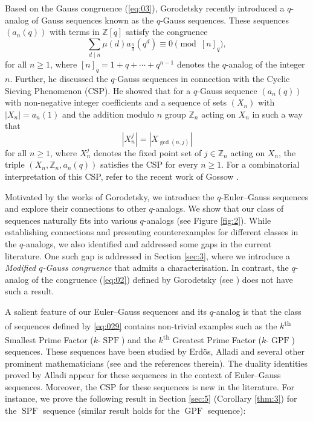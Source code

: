 \documentclass{article}
\numberwithin{equation}{section}
\theoremstyle{definition}
\begin{document}
Based on the Gauss congruence (\ref{eq:03}), Gorodetsky \cite{goro_q-gauss} recently introduced a $q$-analog of Gauss sequences known as the $q$-Gauss sequences. These sequences $(a_{n}(q))$ with terms in $\mathbb{Z}[q]$ satisfy the congruence
\begin{equation}
  \sum_{d\mid n}\mu(d)a_\frac{n}{d}(q^d)\equiv0\pmod{[n]_q}, 
\end{equation}
for all $n\geq1$, where $[n]_q=1+q+\cdots+q^{n-1}$ denotes the $q$-analog of the integer $n$. Further, he discussed the $q$-Gauss sequences in connection with the Cyclic Sieving Phenomenon (CSP). 
He showed that for a $q$-Gauss sequence $(a_n(q))$ with non-negative integer coefficients and a sequence of sets $(X_n)$ with $|X_n|=a_n(1)$ and the addition modulo $n$ group $\mathbb{Z}_n$ acting on $X_n$ in such a way that 
\begin{equation}\label{eq:020}
    |X_{n}^j|=|X_{\gcd(n,j)}|
\end{equation}
for all $n\geq1$, where $X_n^j$ denotes the fixed point set of $j\in\mathbb{Z}_n$ acting on $X_n$, the triple $(X_n, \mathbb{Z}_n, a_n(q))$ satisfies the CSP for every $n\geq1$. For a combinatorial interpretation of this CSP, refer to the recent work of Gossow \cite{fern_gauss}. 
  
Motivated by the works of Gorodetsky, we introduce the $q$-Euler--Gauss sequences and explore their connections to other $q$-analogs. We show that our class of sequences naturally fits into various $q$-analogs (see Figure \ref{fig:2}). While establishing connections and presenting counterexamples for different classes in the $q$-analogs, we also identified and addressed some gaps in the current literature. One such gap is addressed in Section \ref{sec:3}, where we introduce a \textit{Modified $q$-Gauss congruence} that admits a characterisation. In contrast, the 
$q$-analog of the congruence (\ref{eq:02}) defined by Gorodetsky (see \cite[Remark 1.2]{goro_q-gauss}) does not have such a result. 

A salient feature of our Euler--Gauss sequences and its $q$-analog is that the class of sequences defined by \ref{eq:029} contains non-trivial examples such as the $k$\textsuperscript{th} Smallest Prime Factor ($k$-$\operatorname{SPF}$) and the $k$\textsuperscript{th} Greatest Prime Factor ($k$-$\operatorname{GPF}$) sequences. These sequences have been studied by Erd\"os, Alladi and several other prominent mathematicians (see \cite{gpfspf0,gpfspf1} and the references therein). The duality identities \cite[Lemma 1]{gpfspf0} proved by Alladi appear for these sequences in the context of Euler--Gauss sequences. Moreover, the CSP for these sequences is new in the literature. For instance, we prove the following result in Section \ref{sec:5} (Corollary \ref{thm:3}) for the $\operatorname{SPF}$ sequence (similar result holds for the $\operatorname{GPF}$ sequence): 
\end{document}
